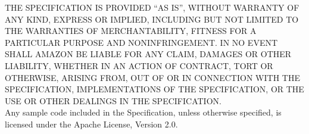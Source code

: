 \noindent THE SPECIFICATION IS PROVIDED “AS IS”, WITHOUT WARRANTY OF ANY KIND,
EXPRESS OR IMPLIED, INCLUDING BUT NOT LIMITED TO THE WARRANTIES OF
MERCHANTABILITY, FITNESS FOR A PARTICULAR PURPOSE AND NONINFRINGEMENT. IN NO
EVENT SHALL AMAZON BE LIABLE FOR ANY CLAIM, DAMAGES OR OTHER LIABILITY, WHETHER
IN AN ACTION OF CONTRACT, TORT OR OTHERWISE, ARISING FROM, OUT OF OR IN
CONNECTION WITH THE SPECIFICATION, IMPLEMENTATIONS OF THE SPECIFICATION, OR THE
USE OR OTHER DEALINGS IN THE SPECIFICATION.\\

\noindent Any sample code included in the Specification, unless otherwise
specified, is licensed under the Apache License, Version 2.0.

\pagebreak